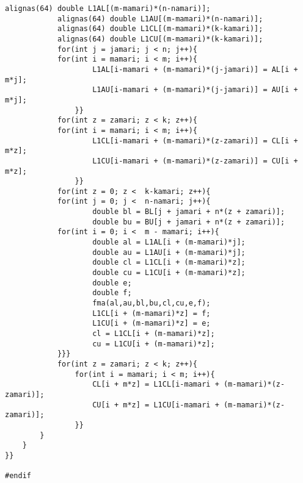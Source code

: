\documentclass[11pt,a4paper]{jsreport}
\theoremstyle{definition}
\begin{document}
\begin{lstlisting}[caption = 本研究で使用したプログラム]
            alignas(64) double L1AL[(m-mamari)*(n-namari)];
            alignas(64) double L1AU[(m-mamari)*(n-namari)];
            alignas(64) double L1CL[(m-mamari)*(k-kamari)];
            alignas(64) double L1CU[(m-mamari)*(k-kamari)];
            for(int j = jamari; j < n; j++){
            for(int i = mamari; i < m; i++){
                    L1AL[i-mamari + (m-mamari)*(j-jamari)] = AL[i + m*j];
                    L1AU[i-mamari + (m-mamari)*(j-jamari)] = AU[i + m*j];
                }}
            for(int z = zamari; z < k; z++){
            for(int i = mamari; i < m; i++){
                    L1CL[i-mamari + (m-mamari)*(z-zamari)] = CL[i + m*z];
                    L1CU[i-mamari + (m-mamari)*(z-zamari)] = CU[i + m*z];
                }}
            for(int z = 0; z <  k-kamari; z++){
            for(int j = 0; j <  n-namari; j++){
                    double bl = BL[j + jamari + n*(z + zamari)];
                    double bu = BU[j + jamari + n*(z + zamari)];
            for(int i = 0; i <  m - mamari; i++){
                    double al = L1AL[i + (m-mamari)*j];
                    double au = L1AU[i + (m-mamari)*j];
                    double cl = L1CL[i + (m-mamari)*z];
                    double cu = L1CU[i + (m-mamari)*z];
                    double e;
                    double f;
                    fma(al,au,bl,bu,cl,cu,e,f);
                    L1CL[i + (m-mamari)*z] = f;
                    L1CU[i + (m-mamari)*z] = e;
                    cl = L1CL[i + (m-mamari)*z];
                    cu = L1CU[i + (m-mamari)*z];
            }}}
            for(int z = zamari; z < k; z++){
                for(int i = mamari; i < m; i++){
                    CL[i + m*z] = L1CL[i-mamari + (m-mamari)*(z-zamari)];
                    CU[i + m*z] = L1CU[i-mamari + (m-mamari)*(z-zamari)];
                }}
        }
    }
}}

#endif
\end{lstlisting}
\end{document}
